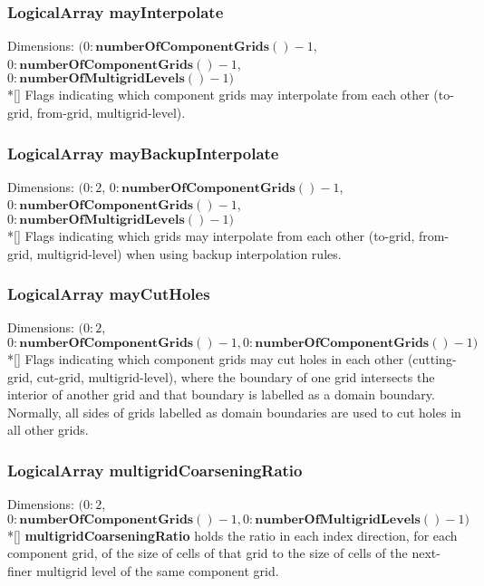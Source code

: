 \documentclass{article}
\begin{document}
  \subsubsection{LogicalArray mayInterpolate}
  \label{CompositeGrid::mayInterpolate}
    Dimensions: $(0\colon\textbf{numberOfComponentGrids}()-1$, $0\colon\textbf{numberOfComponentGrids}()-1$, $0\colon\textbf{numberOfMultigridLevels}()-1)$ \\*[\parskip]
    Flags indicating which component grids may interpolate from each other (to-grid, from-grid, multigrid-level).

  \subsubsection{LogicalArray mayBackupInterpolate}
  \label{CompositeGrid::mayBackupInterpolate}
    Dimensions: $(0\colon2$, $0\colon\textbf{numberOfComponentGrids}()-1$, $0\colon\textbf{numberOfComponentGrids}()-1$, $0\colon\textbf{numberOfMultigridLevels}()-1)$ \\*[\parskip]
    Flags indicating which grids may interpolate from each other (to-grid, from-grid, multigrid-level) when using backup interpolation rules.

  \subsubsection{LogicalArray mayCutHoles}
  \label{CompositeGrid::mayCutHoles}
    Dimensions: $(0\colon2$, $0\colon\textbf{numberOfComponentGrids}()-1,0\colon\textbf{numberOfComponentGrids}()-1)$ \\*[\parskip]
    Flags indicating which component grids may cut holes in each other (cutting-grid, cut-grid, multigrid-level), where the boundary of one
    grid intersects the interior of another grid and that boundary is labelled as a domain boundary.  Normally, all sides of grids labelled
    as domain boundaries are used to cut holes in all other grids.

  \subsubsection{LogicalArray multigridCoarseningRatio}
  \label{CompositeGrid::multigridCoarseningRatio}
    Dimensions: $(0\colon2$, $0\colon\textbf{numberOfComponentGrids}()-1,0\colon\textbf{numberOfMultigridLevels}()-1)$ \\*[\parskip]
    \textbf{multigridCoarseningRatio} holds the ratio in each index direction, for each component grid, of the size of cells of that grid
    to the size of cells of the next-finer multigrid level of the same component grid.
\end{document}
